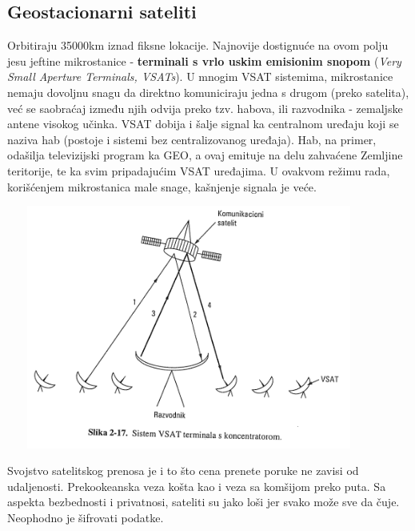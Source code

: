 \documentclass{article} %
\begin{document}
\subsection{Geostacionarni sateliti}
Orbitiraju 35000km iznad fiksne lokacije. Najnovije dostignuće na ovom polju jesu jeftine mikrostanice - \textbf{terminali s vrlo uskim emisionim snopom} (\textit{Very Small Aperture Terminals, VSATs}). U mnogim VSAT sistemima, mikrostanice nemaju dovoljnu snagu da direktno komuniciraju jedna s drugom (preko satelita), već se saobraćaj između njih odvija preko tzv. habova, ili razvodnika - zemaljske antene visokog učinka. VSAT dobija i šalje signal ka centralnom uređaju koji se naziva hab (postoje i sistemi bez centralizovanog uređaja). Hab, na primer, odašilja televizijski program ka GEO, a ovaj emituje na delu zahvaćene Zemljine teritorije, te ka svim pripadajućim VSAT uređajima. U ovakvom režimu rada, korišćenjem mikrostanica male snage, kašnjenje signala je veće.\\
\begin{center}
\includegraphics[width=12cm, height=8cm]{GEO}\\
\end{center}
Svojstvo satelitskog prenosa je i to što cena prenete poruke ne zavisi od udaljenosti. Prekookeanska veza košta kao i veza sa komšijom preko puta. Sa aspekta bezbednosti i privatnosi, sateliti su jako loši jer svako može sve da čuje. Neophodno je šifrovati podatke.
\end{document}
